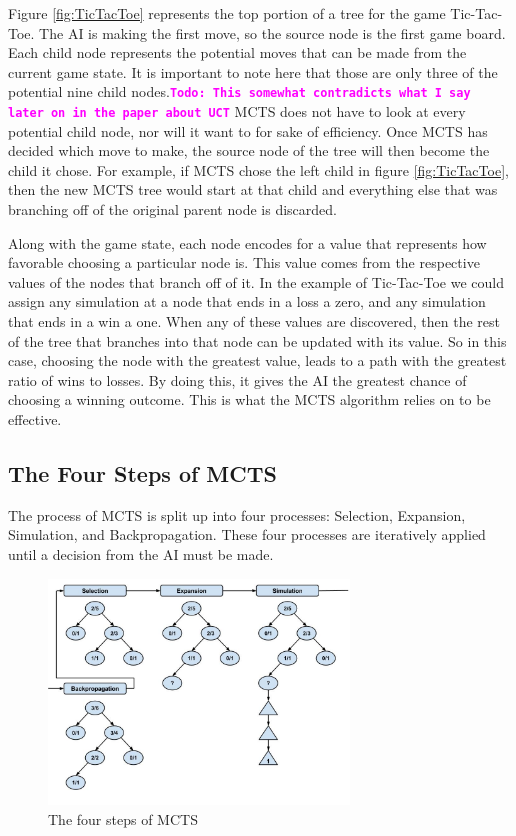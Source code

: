 \documentclass{sig-alternate}
\newcommand{\comment}[1]{{\bf \tt  {#1}}}
\newcommand{\todo}[1]{\textcolor{magenta}{\comment{Todo: {#1}}}}
\begin{document}
Figure \ref{fig:TicTacToe} represents the top portion of a tree for the game Tic-Tac-Toe. The AI is making the first move, so the source node is the first game board. Each child node represents the potential moves that can be made from the current game state. It is important to note here that those are only three of the potential nine child nodes.\todo{This somewhat contradicts what I say later on in the paper about UCT} MCTS does not have to look at every potential child node, nor will it want to for sake of efficiency. Once MCTS has decided which move to make, the source node of the tree will then become the child it chose. For example, if MCTS chose the left child in figure \ref{fig:TicTacToe}, then the new MCTS tree would start at that child and everything else that was branching off of the original parent node is discarded.

Along with the game state, each node encodes for a value that represents how favorable choosing a particular node is. This value comes from the respective values of the nodes that branch off of it. In the example of Tic-Tac-Toe we could assign any simulation at a node that ends in a loss a zero, and any simulation that ends in a win a one. When any of these values are discovered, then the rest of the tree that branches into that node can be updated with its value. So in this case, choosing the node with the greatest value, leads to a path with the greatest ratio of wins to losses. By doing this, it gives the AI the greatest chance of choosing a winning outcome. This is what the MCTS algorithm relies on to be effective.

\subsection{The Four Steps of MCTS}
The process of MCTS is split up into four processes: Selection, Expansion, Simulation, and Backpropagation. These four processes are iteratively applied until a decision from the AI must be made.

\begin{figure}[h]
	\includegraphics[width=8cm]{MCTSFourStepProcess.jpg}
	\centering
	\caption{The four steps of MCTS}
	\label{fig:FourSteps}
\end{figure}
\end{document}
